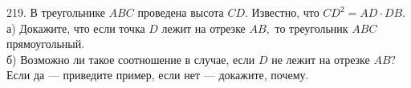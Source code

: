 219. В треугольнике $ABC$ проведена высота $CD.$ Известно, что $CD^2=AD\cdot DB.$\\
а) Докажите, что если точка $D$ лежит на отрезке $AB,$ то треугольник $ABC$ прямоугольный.\\
б) Возможно ли такое соотношение в случае, если $D$ не лежит на отрезке $AB?$ Если да --- приведите пример, если нет --- докажите, почему.\\
